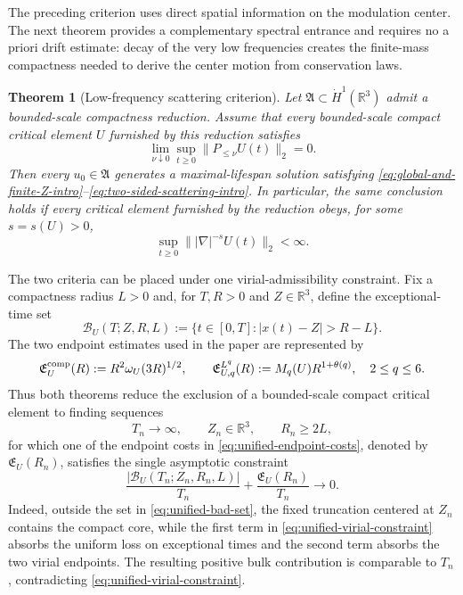 \documentclass[preprint,12pt]{elsarticle}
\numberwithin{equation}{section}
\newtheorem{theorem}{Theorem}[section]
\theoremstyle{remark}
\newcommand{\R}{\mathbb R}
\begin{document}
The preceding criterion uses direct spatial information on the modulation center.  The next theorem provides a complementary spectral entrance and requires no a priori drift estimate: decay of the very low frequencies creates the finite-mass compactness needed to derive the center motion from conservation laws.

\begin{theorem}[Low-frequency scattering criterion]\label{thm:lowfreq-scattering}
Let $\mathfrak A\subset\dot H^1(\R^3)$ admit a bounded-scale compactness reduction. Assume that every bounded-scale compact critical element $U$ furnished by this reduction satisfies
\begin{equation}\label{eq:lowfreq-main}
  \lim_{\nu\downarrow0}
  \sup_{t\ge0}\|P_{\le\nu}U(t)\|_2=0.
\end{equation}
Then every $u_0\in\mathfrak A$ generates a maximal-lifespan solution satisfying \eqref{eq:global-and-finite-Z-intro}--\eqref{eq:two-sided-scattering-intro}.  In particular, the same conclusion holds if every critical element furnished by the reduction obeys, for some $s=s(U)>0$,
\begin{equation}\label{eq:negative-regularity-entrance}
  \sup_{t\ge0}\||\nabla|^{-s}U(t)\|_2<\infty.
\end{equation}
\end{theorem}

The two criteria can be placed under one virial-admissibility constraint.  Fix a compactness radius $L>0$ and, for $T,R>0$ and $Z\in\R^3$, define the exceptional-time set
\begin{equation}\label{eq:unified-bad-set}
  \mathcal B_U(T;Z,R,L)
  :=\bigl\{t\in[0,T]:|x(t)-Z|>R-L\bigr\}.
\end{equation}
The two endpoint estimates used in the paper are represented by
\begin{equation}\label{eq:unified-endpoint-costs}
  \mathfrak E_U^{\rm comp}(R)
  :=R^2\omega_U(3R)^{1/2},
  \qquad
  \mathfrak E_{U,q}^{L^q}(R)
  :=M_q(U)R^{1+\theta(q)},
  \quad 2\le q\le6.
\end{equation}
Thus both theorems reduce the exclusion of a bounded-scale compact critical element to finding sequences
\[
  T_n\to\infty,
  \qquad Z_n\in\R^3,
  \qquad R_n\ge2L,
\]
for which one of the endpoint costs in \eqref{eq:unified-endpoint-costs}, denoted by $\mathfrak E_U(R_n)$, satisfies the single asymptotic constraint
\begin{equation}\label{eq:unified-virial-constraint}
  \frac{|\mathcal B_U(T_n;Z_n,R_n,L)|}{T_n}
  +\frac{\mathfrak E_U(R_n)}{T_n}
  \longrightarrow0.
\end{equation}
Indeed, outside the set in \eqref{eq:unified-bad-set}, the fixed truncation centered at $Z_n$ contains the compact core, while the first term in \eqref{eq:unified-virial-constraint} absorbs the uniform loss on exceptional times and the second term absorbs the two virial endpoints.  The resulting positive bulk contribution is comparable to $T_n$, contradicting \eqref{eq:unified-virial-constraint}.
\end{document}

